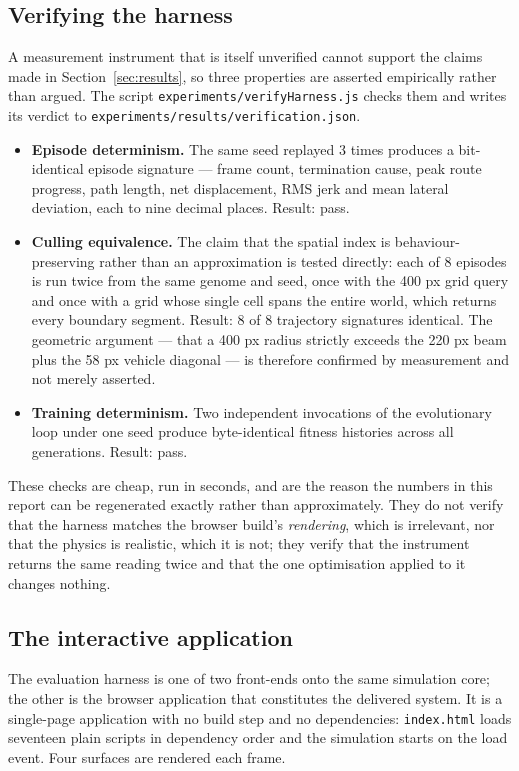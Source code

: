 \documentclass[conference]{IEEEtran}
\begin{document}
\subsection{Verifying the harness}

A measurement instrument that is itself unverified cannot support the claims made in Section~\ref{sec:results}, so three properties are asserted empirically rather than argued. The script \texttt{experiments/verifyHarness.js} checks them and writes its verdict to \texttt{experiments/results/verification.json}.

\begin{itemize}
\item \textbf{Episode determinism.} The same seed replayed 3 times produces a bit-identical episode signature — frame count, termination cause, peak route progress, path length, net displacement, RMS jerk and mean lateral deviation, each to nine decimal places. Result: pass.
\item \textbf{Culling equivalence.} The claim that the spatial index is behaviour-preserving rather than an approximation is tested directly: each of 8 episodes is run twice from the same genome and seed, once with the 400 px grid query and once with a grid whose single cell spans the entire world, which returns every boundary segment. Result: 8 of 8 trajectory signatures identical. The geometric argument — that a 400 px radius strictly exceeds the 220 px beam plus the 58 px vehicle diagonal — is therefore confirmed by measurement and not merely asserted.
\item \textbf{Training determinism.} Two independent invocations of the evolutionary loop under one seed produce byte-identical fitness histories across all generations. Result: pass.
\end{itemize}

These checks are cheap, run in seconds, and are the reason the numbers in this report can be regenerated exactly rather than approximately. They do not verify that the harness matches the browser build's \emph{rendering}, which is irrelevant, nor that the physics is realistic, which it is not; they verify that the instrument returns the same reading twice and that the one optimisation applied to it changes nothing.

\subsection{The interactive application}

The evaluation harness is one of two front-ends onto the same simulation core; the other is the browser application that constitutes the delivered system. It is a single-page application with no build step and no dependencies: \texttt{index.html} loads seventeen plain scripts in dependency order and the simulation starts on the load event. Four surfaces are rendered each frame.
\end{document}
